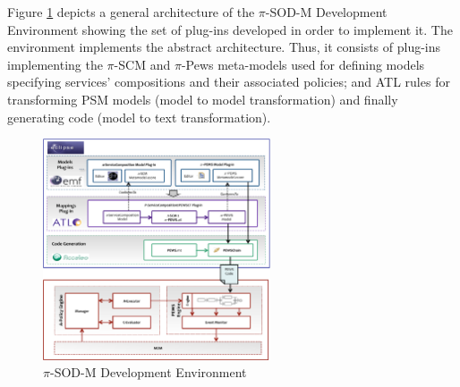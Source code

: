 Figure \ref{fig:policymanager} depicts a general architecture of the $\pi$-SOD-M Development Environment showing the set of plug-ins  developed in order to implement it. The environment implements the abstract architecture. Thus, it consists of plug-ins implementing the $\pi$-SCM and $\pi$-{\sc Pews} meta-models used for defining models specifying services' compositions and their associated policies; and ATL rules for transforming  PSM models (model to model transformation) and finally generating code (model to text transformation).
\begin{figure}[t]
	\begin{center}
		\includegraphics[width=0.60\textwidth]{figs/architecture}
	\end{center}
		\caption{$\pi$-SOD-M Development Environment}
   \label{fig:policymanager}
\end{figure}
